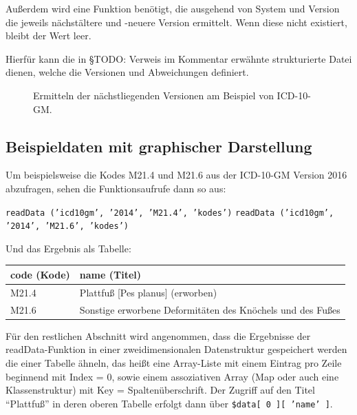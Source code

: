 Außerdem wird eine Funktion benötigt, die ausgehend von System und Version die jeweils nächstältere und -neuere Version ermittelt. Wenn diese nicht existiert, bleibt der Wert leer. 

Hierfür kann die in %
{\color{blue} §TODO: Verweis im Kommentar}
erwähnte strukturierte Datei dienen, welche die Versionen und Abweichungen definiert. 


\begin{figure}[H]
    \centering\large%
    \resizebox{.99\linewidth}{!}{}
    \normalsize\vspace{-1em}\caption{Ermitteln der nächstliegenden Versionen am Beispiel von ICD-10-GM.}
\end{figure}

\subsection{Beispieldaten mit graphischer Darstellung}

Um beispielsweise die Kodes M21.4 und M21.6 aus der ICD-10-GM Version 2016 abzufragen, sehen die Funktionsaufrufe dann so aus:

\texttt{readData ('icd10gm', '2014', 'M21.4', 'kodes')} \newline
\texttt{readData ('icd10gm', '2014', 'M21.6', 'kodes')}

Und das Ergebnis als Tabelle:

\begin{centernss}
\renewcommand{\arraystretch}{1.2}
\setlength{\tabcolsep}{12pt}
\begin{tabular}{ll}
code (Kode) & name (Titel) \\
\hline
M21.4 & Plattfuß [Pes planus] (erworben) \\
M21.6 & Sonstige erworbene Deformitäten des Knöchels und des Fußes \\
\end{tabular}
\end{centernss}

Für den restlichen Abschnitt wird angenommen, dass die Ergebnisse der readData-Funktion in einer zweidimensionalen Datenstruktur gespeichert werden die einer Tabelle ähneln, das heißt eine Array-Liste mit einem Eintrag pro Zeile beginnend mit Index = 0, sowie einem assoziativen Array (Map oder auch eine Klassenstruktur) mit Key = Spaltenüberschrift. Der Zugriff auf den Titel "`Plattfuß"' in deren oberen Tabelle erfolgt dann über \texttt{\$data[ 0 ][ 'name' ]}.

